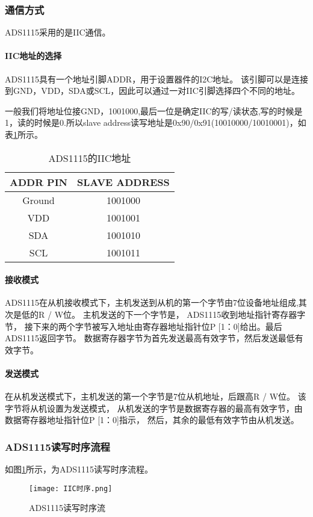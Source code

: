 \documentclass[lang=cn,11pt,a4paper]{elegantpaper}
\begin{document}
\subsubsection{通信方式}
ADS1115采用的是IIC通信。
\paragraph{IIC地址的选择}
ADS1115具有一个地址引脚ADDR，用于设置器件的I2C地址。 该引脚可以是连接到GND，VDD，SDA或SCL，因此可以通过一对IIC引脚选择四个不同的地址。

一般我们将地址位接GND，1001000,最后一位是确定IIC的写/读状态,写的时候是1，读的时候是0.所以slave address读写地址是0x90/0x91(10010000/10010001)，如表\ref{tab:IIC}所示。

\begin{table}[!ht]
  \centering
  \caption{ADS1115的IIC地址}
  \begin{tabular}{cc}
    \textbf{ADDR PIN} & \textbf{SLAVE ADDRESS } \\ \hline
    Ground            & 1001000                 \\
    VDD               & 1001001                 \\
    SDA               & 1001010                 \\
    SCL               & 1001011                 \\
  \end{tabular}
  \label{tab:IIC}
\end{table}

\paragraph{接收模式}
ADS1115在从机接收模式下，主机发送到从机的第一个字节由7位设备地址组成,其次是低的R / W位。 主机发送的下一个字节是， ADS1115收到地址指针寄存器字节， 接下来的两个字节被写入地址由寄存器地址指针位P [1：0]给出。最后ADS1115返回字节。 数据寄存器字节为首先发送最高有效字节，然后发送最低有效字节。

\paragraph{发送模式}
在从机发送模式下，主机发送的第一个字节是7位从机地址，后跟高R / W位。 该字节将从机设置为发送模式， 从机发送的字节是数据寄存器的最高有效字节，由数据寄存器地址指针位P [1：0]指示， 然后，其余的最低有效字节由从机发送。

\subsubsection{ADS1115读写时序流程}
如图\ref{fig:IICTimeSequence}所示，为ADS1115读写时序流程。
\begin{figure}[!htb]
  \centering
  \texttt{[image: IIC时序.png]}
  \caption{ADS1115读写时序流}
  \label{fig:IICTimeSequence}
\end{figure}
\end{document}
